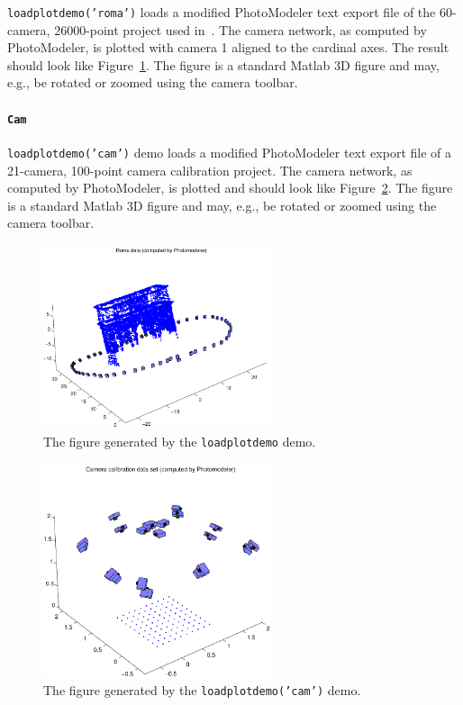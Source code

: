 \documentclass{article}
\begin{document}
\texttt{loadplotdemo('roma')} loads a modified PhotoModeler text export file
of the 60-camera, 26000-point project used
in~\citet{Borlin2013:Bundle}. The camera network, as computed by
PhotoModeler, is plotted with camera 1 aligned to the cardinal axes.
The result should look like Figure~\ref{fig:roma}. The figure is a
standard Matlab 3D figure and may, e.g., be rotated or zoomed using
the camera toolbar.

\paragraph{\texttt{Cam}}
\label{sec:camcaldata}
\texttt{loadplotdemo('cam')} demo loads a modified PhotoModeler text export
file of a 21-camera, 100-point camera calibration project. The camera
network, as computed by PhotoModeler, is plotted and should look like
Figure~\ref{fig:camcalib}. The figure is a standard Matlab 3D figure and
may, e.g., be rotated or zoomed using the camera toolbar.


\begin{figure}[tbp]
\centering
\includegraphics[width=0.6\textwidth]{./ill/roma.pdf}
\caption{\label{fig:roma}
The figure generated by the \texttt{loadplotdemo} demo.}
\end{figure}

\begin{figure}[tbp]
\centering
\includegraphics[width=0.6\textwidth]{./ill/ccam.pdf}
\caption{\label{fig:camcalib}
The figure generated by the \texttt{loadplotdemo('cam')} demo.}
\end{figure}
\end{document}
